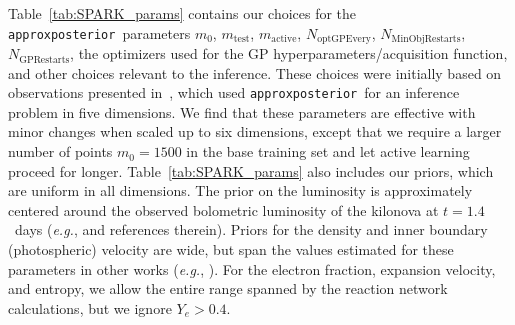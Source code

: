 \documentclass[twocolumn, twocolappendix]{aastex63}
\def\approxposterior{\texttt{approxposterior}}
\def\eg{{\it e.g.}}
\begin{document}
Table~\ref{tab:SPARK_params} contains our choices for the \approxposterior~parameters $m_0$, $m_{\mathrm{test}}$, $m_{\mathrm{active}}$, $N_{\mathrm{optGPEvery}}$, $N_{\mathrm{MinObjRestarts}}$, $N_{\mathrm{GPRestarts}}$, the optimizers used for the GP hyperparameters/acquisition function, and other choices relevant to the inference. These choices were initially based on observations presented in~\cite{fleming20}, which used \approxposterior~for an inference problem in five dimensions. We find that these parameters are effective with minor changes when scaled up to six dimensions, except that we require a larger number of points $m_0 = 1500$ in the base training set and let active learning proceed for longer. Table~\ref{tab:SPARK_params} also includes our priors, which are uniform in all dimensions. The prior on the luminosity is approximately centered around the observed bolometric luminosity of the kilonova at $t=1.4$~days (\eg, \citealt{villar17} and references therein). Priors for the density and inner boundary (photospheric) velocity are wide, but span the values estimated for these parameters in other works (\eg, \citealt{kasen17, villar17, watson19, domoto21, gillanders21, gillanders22}). For the electron fraction, expansion velocity, and entropy, we allow the entire range spanned by the reaction network calculations, but we ignore $Y_e > 0.4$.
\end{document}
